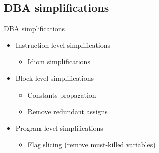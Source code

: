 \subsection{DBA simplifications}


\begin{frame}{DBA simplifications}
       \begin{itemize}
       \item Instruction level simplifications
       \begin{itemize}  
       \item Idiom simplifications
       \end{itemize}
       \bigskip
       \item  Block level simplifications
       \begin{itemize}
       \item Constants propagation
       \item Remove redundant assigns
       \end{itemize}
       \bigskip
       \item Program level simplifications
       \begin{itemize}
       \item Flag slicing (remove must-killed variables)
       \end{itemize}
       \end{itemize}
\end{frame}



